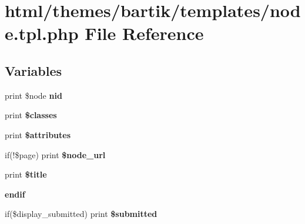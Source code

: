 \hypertarget{themes_2bartik_2templates_2node_8tpl_8php}{
\section{html/themes/bartik/templates/node.tpl.php File Reference}
\label{themes_2bartik_2templates_2node_8tpl_8php}
}
\subsection*{Variables}
\begin{DoxyCompactItemize}
\item 
\hypertarget{themes_2bartik_2templates_2node_8tpl_8php_aff83bc4c67cdf5b085d181488eea273f}{
print \$node {\bfseries nid}}
\label{themes_2bartik_2templates_2node_8tpl_8php_aff83bc4c67cdf5b085d181488eea273f}

\item 
\hypertarget{themes_2bartik_2templates_2node_8tpl_8php_a6d48ecbdbc70ca1812e665169b5fa1e2}{
print {\bfseries \$classes}}
\label{themes_2bartik_2templates_2node_8tpl_8php_a6d48ecbdbc70ca1812e665169b5fa1e2}

\item 
\hypertarget{themes_2bartik_2templates_2node_8tpl_8php_a9c88c4272fa40546577b45392a0b3cd3}{
print {\bfseries \$attributes}}
\label{themes_2bartik_2templates_2node_8tpl_8php_a9c88c4272fa40546577b45392a0b3cd3}

\item 
\hypertarget{themes_2bartik_2templates_2node_8tpl_8php_aef4d429b668c3d734db6c8cb02ed1f41}{
if(!\$page) print {\bfseries \$node\_\-url}}
\label{themes_2bartik_2templates_2node_8tpl_8php_aef4d429b668c3d734db6c8cb02ed1f41}

\item 
\hypertarget{themes_2bartik_2templates_2node_8tpl_8php_aec2795512d255332f57cacd930a090b4}{
print {\bfseries \$title}}
\label{themes_2bartik_2templates_2node_8tpl_8php_aec2795512d255332f57cacd930a090b4}

\item 
\hypertarget{themes_2bartik_2templates_2node_8tpl_8php_ad2e226821d291cc3ddac2c62f4aa7fd9}{
{\bfseries endif}}
\label{themes_2bartik_2templates_2node_8tpl_8php_ad2e226821d291cc3ddac2c62f4aa7fd9}

\item 
\hypertarget{themes_2bartik_2templates_2node_8tpl_8php_a1b949c71b008eb9ce1fad88cf132797b}{
if(\$display\_\-submitted) print {\bfseries \$submitted}}
\label{themes_2bartik_2templates_2node_8tpl_8php_a1b949c71b008eb9ce1fad88cf132797b}


\end{DoxyCompactItemize}
